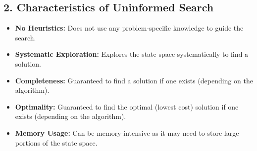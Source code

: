 \subsection{2. Characteristics of Uninformed Search}
\begin{itemize}
  \item   \textbf{No Heuristics:} Does not use any problem-specific knowledge to guide the search.
  \item   \textbf{Systematic Exploration:} Explores the state space systematically to find a solution.
  \item   \textbf{Completeness:} Guaranteed to find a solution if one exists (depending on the algorithm).
  \item   \textbf{Optimality:} Guaranteed to find the optimal (lowest cost) solution if one exists (depending on the algorithm).
  \item   \textbf{Memory Usage:} Can be memory-intensive as it may need to store large portions of the state space.
\end{itemize}

